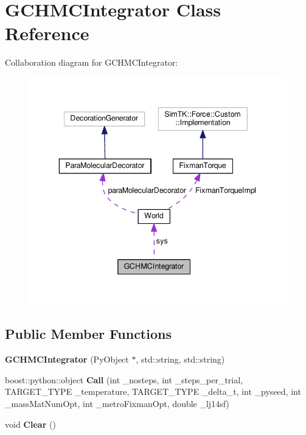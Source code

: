 \hypertarget{classGCHMCIntegrator}{}\section{G\+C\+H\+M\+C\+Integrator Class Reference}
\label{classGCHMCIntegrator}


Collaboration diagram for G\+C\+H\+M\+C\+Integrator\+:\nopagebreak
\begin{figure}[H]
\begin{center}
\leavevmode
\includegraphics[width=343pt]{classGCHMCIntegrator__coll__graph}
\end{center}
\end{figure}
\subsection*{Public Member Functions}
\begin{DoxyCompactItemize}
\item 
{\bfseries G\+C\+H\+M\+C\+Integrator} (Py\+Object $\ast$, std\+::string, std\+::string)\hypertarget{classGCHMCIntegrator_ae32d76dd39c412ef0fda999102e2071a}{}\label{classGCHMCIntegrator_ae32d76dd39c412ef0fda999102e2071a}

\item 
boost\+::python\+::object {\bfseries Call} (int \+\_\+nosteps, int \+\_\+steps\+\_\+per\+\_\+trial, T\+A\+R\+G\+E\+T\+\_\+\+T\+Y\+PE \+\_\+temperature, T\+A\+R\+G\+E\+T\+\_\+\+T\+Y\+PE \+\_\+delta\+\_\+t, int \+\_\+pyseed, int \+\_\+mass\+Mat\+Num\+Opt, int \+\_\+metro\+Fixman\+Opt, double \+\_\+lj14sf)\hypertarget{classGCHMCIntegrator_abd20da7bc04de77b77cbe44d0af154e6}{}\label{classGCHMCIntegrator_abd20da7bc04de77b77cbe44d0af154e6}

\item 
void {\bfseries Clear} ()\hypertarget{classGCHMCIntegrator_a334218cacf7caf7d4d0026d7518f5a07}{}\label{classGCHMCIntegrator_a334218cacf7caf7d4d0026d7518f5a07}

\end{DoxyCompactItemize}
